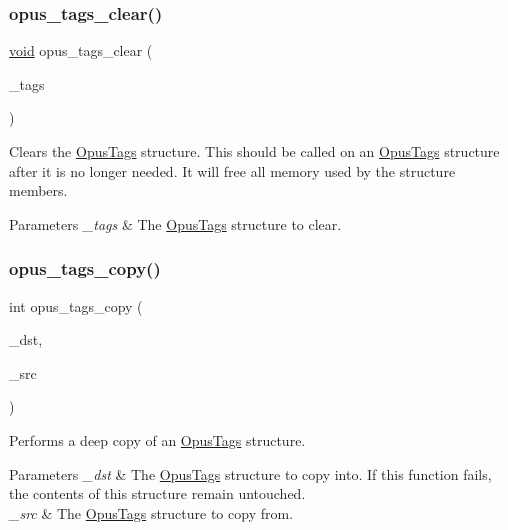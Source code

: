 \subsubsection{\texorpdfstring{opus\_tags\_clear()}{opus\_tags\_clear()}}
{\footnotesize\ttfamily \mbox{\hyperlink{_s_d_l__opengles2__gl2ext_8h_ae5d8fa23ad07c48bb609509eae494c95}{void}} opus\+\_\+tags\+\_\+clear (\begin{DoxyParamCaption}\item[{\mbox{\hyperlink{struct_opus_tags}{Opus\+Tags}} $\ast$}]{\+\_\+tags }\end{DoxyParamCaption})}

Clears the \mbox{\hyperlink{struct_opus_tags}{Opus\+Tags}} structure. This should be called on an \mbox{\hyperlink{struct_opus_tags}{Opus\+Tags}} structure after it is no longer needed. It will free all memory used by the structure members. 
\begin{DoxyParams}{Parameters}
{\em \+\_\+tags} & The \mbox{\hyperlink{struct_opus_tags}{Opus\+Tags}} structure to clear. \\
\hline
\end{DoxyParams}
\mbox{\label{group__header__info_gaceda528fa8f9f9ad1443df2eeeeaa8bf}} 
\subsubsection{\texorpdfstring{opus\_tags\_copy()}{opus\_tags\_copy()}}
{\footnotesize\ttfamily int opus\+\_\+tags\+\_\+copy (\begin{DoxyParamCaption}\item[{\mbox{\hyperlink{struct_opus_tags}{Opus\+Tags}} $\ast$}]{\+\_\+dst,  }\item[{const \mbox{\hyperlink{struct_opus_tags}{Opus\+Tags}} $\ast$}]{\+\_\+src }\end{DoxyParamCaption})}

Performs a deep copy of an \mbox{\hyperlink{struct_opus_tags}{Opus\+Tags}} structure. 
\begin{DoxyParams}{Parameters}
{\em \+\_\+dst} & The \mbox{\hyperlink{struct_opus_tags}{Opus\+Tags}} structure to copy into. If this function fails, the contents of this structure remain untouched. \\
\hline
{\em \+\_\+src} & The \mbox{\hyperlink{struct_opus_tags}{Opus\+Tags}} structure to copy from. \\
\hline
\end{DoxyParams}

